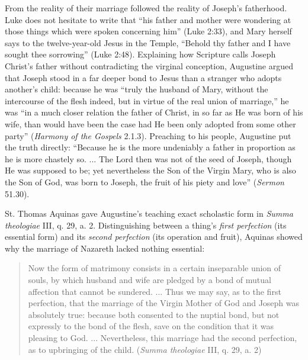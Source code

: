 From the reality of their marriage followed the reality of Joseph's fatherhood. Luke does not hesitate to write that ``his father and mother were wondering at those things which were spoken concerning him'' (Luke 2:33), and Mary herself says to the twelve-year-old Jesus in the Temple, ``Behold thy father and I have sought thee sorrowing'' (Luke 2:48). Explaining how Scripture calls Joseph Christ's father without contradicting the virginal conception, Augustine argued that Joseph stood in a far deeper bond to Jesus than a stranger who adopts another's child: because he was ``truly the husband of Mary, without the intercourse of the flesh indeed, but in virtue of the real union of marriage,'' he was ``in a much closer relation the father of Christ, in so far as He was born of his wife, than would have been the case had He been only adopted from some other party'' (\textit{Harmony of the Gospels} 2.1.3). Preaching to his people, Augustine put the truth directly: ``Because he is the more undeniably a father in proportion as he is more chastely so. ... The Lord then was not of the seed of Joseph, though He was supposed to be; yet nevertheless the Son of the Virgin Mary, who is also the Son of God, was born to Joseph, the fruit of his piety and love'' (\textit{Sermon} 51.30).

St. Thomas Aquinas gave Augustine's teaching exact scholastic form in \textit{Summa theologiae} III, q. 29, a. 2. Distinguishing between a thing's \textit{first perfection} (its essential form) and its \textit{second perfection} (its operation and fruit), Aquinas showed why the marriage of Nazareth lacked nothing essential:

\begin{quote}\small
Now the form of matrimony consists in a certain inseparable union of souls, by which husband and wife are pledged by a bond of mutual affection that cannot be sundered. ... Thus we may say, as to the first perfection, that the marriage of the Virgin Mother of God and Joseph was absolutely true: because both consented to the nuptial bond, but not expressly to the bond of the flesh, save on the condition that it was pleasing to God. ... Nevertheless, this marriage had the second perfection, as to upbringing of the child. (\textit{Summa theologiae} III, q. 29, a. 2)
\end{quote}

